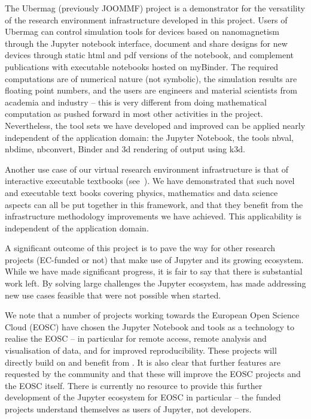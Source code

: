 \begin{compactenum}[\bf {Obj} 1\rm]
  The Ubermag (previously JOOMMF) project is a demonstrator for the
  versatility of the research environment infrastructure developed in
  this project.  Users of Ubermag can control simulation tools for
  devices based on nanomagnetism through the Jupyter notebook
  interface, document and share designs for new devices through static
  html and pdf versions of the notebook, and complement publications
  with executable notebooks hosted on myBinder. The required
  computations are of numerical nature (not symbolic), the simulation
  results are floating point numbers, and the users are engineers and
  material scientists from academia and industry -- this is very
  different from doing mathematical computation as pushed forward in
  most other activities in the project. Nevertheless, the tool sets we
  have developed and improved can be applied nearly independent of the application
  domain: the Jupyter Notebook, the tools nbval, nbdime, nbconvert,
  Binder and 3d rendering of output using k3d.

  Another use case of our virtual research environment infrastructure
  is that of interactive executable textbooks (see~).
  We have demonstrated
  that such novel and executable text books covering physics,
  mathematics and data science aspects can all be put together in this
  framework, and that they benefit from the infrastructure methodology
  improvements we have achieved. This applicability is independent of
  the application domain.

  A significant outcome of this project is to pave the way for
  other research projects (EC-funded or not) that make use of Jupyter
  and its growing ecosystem. While we have made significant progress,
  it is fair to say that there is substantial work left.
  By solving large challenges the Jupyter ecosystem,
  \ODK has made addressing new use cases feasible
  that were not possible when \ODK started.

  We note that a number of projects working towards the European Open
  Science Cloud (EOSC) have chosen the Jupyter Notebook and tools as a
  technology to realise the EOSC -- in particular for remote access,
  remote analysis and visualisation of data, and for improved
  reproducibility. These projects will directly build on and benefit
  from \ODK.  It is also clear that further features are
  requested by the community and that these will improve the EOSC
  projects and the EOSC itself.  There is currently no resource to
  provide this further development of the Jupyter ecosystem for EOSC in particular -- the funded projects understand themselves
  as users of Jupyter, not developers.


\end{compactenum}
